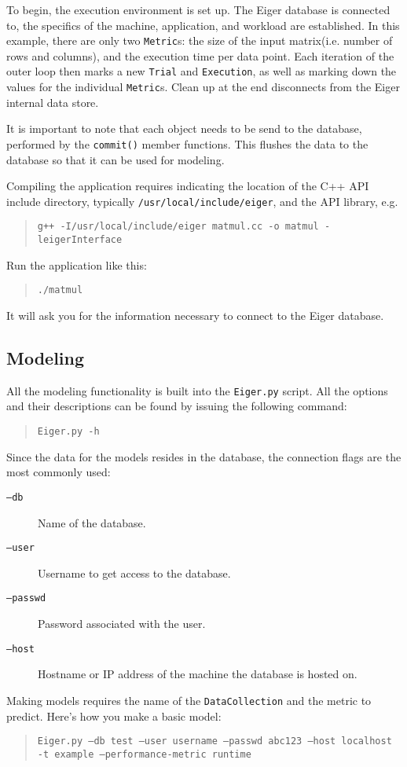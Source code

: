 To begin, the execution environment is set up. The Eiger database is connected to, the specifics of the machine, application, and workload are established. In this example, there are only two \texttt{Metric}s: the size of the input matrix(i.e. number of rows and columns), and the execution time per data point. Each iteration of the outer loop then marks a new \texttt{Trial} and \texttt{Execution}, as well as marking down the values for the individual \texttt{Metric}s. Clean up at the end disconnects from the Eiger internal data store.

It is important to note that each object needs to be send to the database, performed by the \texttt{commit()} member functions. This flushes the data to the database so that it can be used for modeling.

Compiling the application requires indicating the location of the C++ API include directory, typically \texttt{/usr/local/include/eiger}, and the API library, e.g.
	\begin{quote}
	\texttt{g++ -I/usr/local/include/eiger matmul.cc -o matmul -leigerInterface}
	\end{quote}

Run the application like this:
	\begin{quote}
	\texttt{./matmul}
	\end{quote}
It will ask you for the information necessary to connect to the Eiger database.

\subsection{Modeling}
All the modeling functionality is built into the \texttt{Eiger.py} script. All the options and their descriptions can be found by issuing the following command: 
	\begin{quote}
	\texttt{Eiger.py -h}
	\end{quote}

Since the data for the models resides in the database, the connection flags are the most commonly used:
	\begin{description}
	\item[\texttt{--db}] Name of the database.
	\item[\texttt{--user}] Username to get access to the database.
	\item[\texttt{--passwd}] Password associated with the user.
	\item[\texttt{--host}] Hostname or IP address of the machine the database is hosted on.
	\end{description}
Making models requires the name of the \texttt{DataCollection} and the metric to predict. Here's how you make a basic model:
	\begin{quote}
	\texttt{Eiger.py --db test --user username --passwd abc123 --host localhost 
                     -t example --performance-metric runtime}
	\end{quote}

